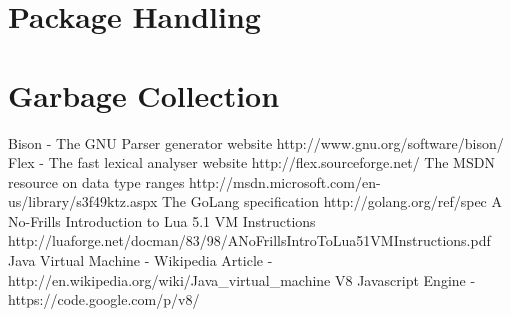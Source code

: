 \documentclass[]{final_report}
\begin{document}
\chapter{Package Handling}

\chapter{Garbage Collection}

\newpage
\begin{thebibliography}{99}
 Bison - The GNU Parser generator website http://www.gnu.org/software/bison/
 Flex - The fast lexical analyser website http://flex.sourceforge.net/
 The MSDN resource on data type ranges http://msdn.microsoft.com/en-us/library/s3f49ktz.aspx
 The GoLang specification http://golang.org/ref/spec
 A No-Frills Introduction to Lua 5.1 VM Instructions http://luaforge.net/docman/83/98/ANoFrillsIntroToLua51VMInstructions.pdf‎
 Java Virtual Machine - Wikipedia Article - http://en.wikipedia.org/wiki/Java\_virtual\_machine
 V8 Javascript Engine - https://code.google.com/p/v8/
\end{thebibliography}
\label{endpage}
\end{document}
